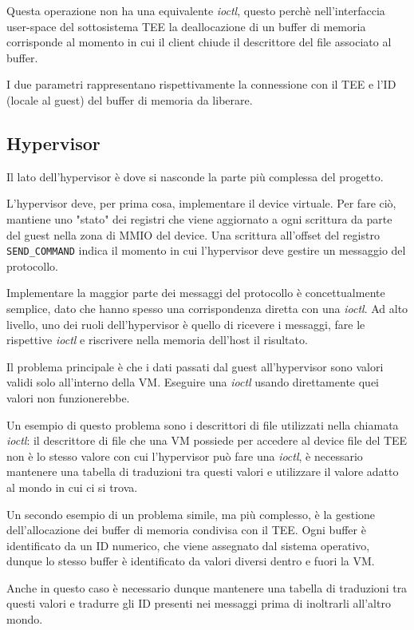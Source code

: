 \documentclass[12pt,italian]{report}
\begin{document}
Questa operazione non ha una equivalente \textit{ioctl}, questo perchè
nell'interfaccia user-space del sottosistema TEE la deallocazione di un
buffer di memoria corrisponde al momento in cui il client chiude il
descrittore del file associato al buffer.

I due parametri rappresentano rispettivamente la connessione con il TEE
e l'ID (locale al guest) del buffer di memoria da liberare.

\subsection{Hypervisor}
\label{subsection:hypervisor}
Il lato dell'hypervisor è dove si nasconde la parte più complessa del progetto.

L'hypervisor deve, per prima cosa, implementare il device virtuale.
Per fare ciò, mantiene uno "stato" dei registri che viene aggiornato a ogni
scrittura da parte del guest nella zona di MMIO del device.
Una scrittura all'offset del registro \texttt{SEND\_COMMAND} indica il momento
in cui l'hypervisor deve gestire un messaggio del protocollo.

Implementare la maggior parte dei messaggi del protocollo è concettualmente
semplice, dato che hanno spesso una corrispondenza diretta con una
\textit{ioctl}.
Ad alto livello, uno dei ruoli dell'hypervisor è quello di ricevere
i messaggi, fare le rispettive \textit{ioctl} e riscrivere nella memoria
dell'host il risultato.

Il problema principale è che i dati passati dal guest all'hypervisor sono
valori validi solo all'interno della VM. Eseguire una \textit{ioctl}
usando direttamente quei valori non funzionerebbe.

Un esempio di questo problema sono i descrittori di file utilizzati nella
chiamata \textit{ioctl}: 
il descrittore di file che una VM possiede per accedere al device file del TEE
non è lo stesso valore con cui l'hypervisor può fare una \textit{ioctl},
è necessario mantenere una tabella di traduzioni tra questi valori e
utilizzare il valore adatto al mondo in cui ci si trova.

Un secondo esempio di un problema simile, ma più complesso, è la gestione
dell'allocazione dei buffer di memoria condivisa con il TEE.
Ogni buffer è identificato da un ID numerico, che viene assegnato dal sistema
operativo, dunque lo stesso buffer è identificato da valori diversi dentro
e fuori la VM.

Anche in questo caso è necessario dunque mantenere una tabella di traduzioni
tra questi valori e tradurre gli ID presenti nei messaggi prima di inoltrarli
all'altro mondo.
\end{document}
